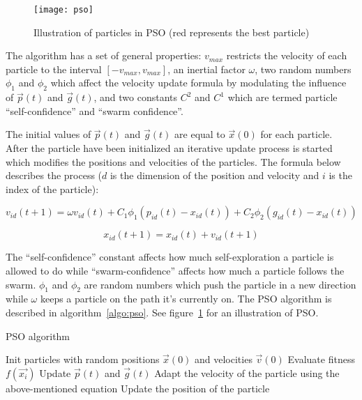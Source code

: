 \begin{figure}[H]
  \centering
  \texttt{[image: pso]}
  \caption{Illustration of particles in PSO (red represents the best particle)}
  \label{fig:pso}
\end{figure}

The algorithm has a set of general properties: $v_{max}$ restricts the velocity of each particle to the interval $[-v_{max},v_{max}]$, an inertial factor $\omega$, two random numbers $\phi_1$ and $\phi_2$ which affect the velocity update formula by modulating the influence of $\vec{p}(t)$ and $\vec{g}(t)$, and two constants $C^2$ and $C^1$ which are termed particle “self-confidence” and “swarm confidence”.

The initial values of $\vec{p}(t)$ and $\vec{g}(t)$ are equal to $\vec{x}(0)$ for each particle. After the particle have been initialized an iterative update process is started which modifies the positions and velocities of the particles. The formula below describes the process ($d$ is the dimension of the position and velocity and $i$ is the index of the particle):

\begin{equation}
  v_{id} (t+1) = \omega v_{id} (t) + C_1 \phi_1 (p_{id} (t) - x_{id} (t)) + C_2 \phi_2 (g_{id} (t) - x_{id} (t))
\end{equation}

\begin{equation}
  x_{id} (t+1) = x_{id} (t) + v_{id} (t+1)
\end{equation}

The “self-confidence” constant affects how much self-exploration a particle is allowed to do while “swarm-confidence” affects how much a particle follows the swarm. $\phi_1$ and $\phi_2$ are random numbers which push the particle in a new direction while $\omega$ keeps a particle on the path it’s currently on. The PSO algorithm is described in algorithm~\ref{algo:pso}. See figure~\ref{fig:pso} for an illustration of PSO.

\begin{algorithm}[h]
  \caption{PSO algorithm}
  \label{algo:pso}
    \begin{algorithmic}
      \State Init particles with random positions
      $\vec{x}(0)$ and velocities $\vec{v}(0)$
      \Repeat
          \State Evaluate fitness $f(\vec{x_i})$
          \State Update $\vec{p}(t)$ and $\vec{g}(t)$
          \State Adapt the velocity of the particle using the above-mentioned equation
          \State Update the position of the particle
        \EndFor
    \end{algorithmic}
\end{algorithm}




